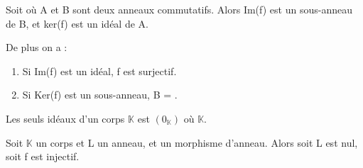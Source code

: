 \documentclass[a4paper, 12pt]{article}
\begin{document}
\begin{proposition}
	Soit  où A et B sont deux anneaux commutatifs. Alors
	Im(f) est un sous-anneau de B, et ker(f) est un idéal de A.

	De plus on a :
	\begin{enumerate}
		\item Si Im(f) est un idéal, f est surjectif.
		\item Si Ker(f) est un sous-anneau, B = .
	\end{enumerate}
\end{proposition}

\begin{proposition}
	Les seuls idéaux d'un corps $\mathbb{K}$ est $(0_{\mathbb{K}})$ où
	$\mathbb{K}$.
\end{proposition}

\begin{corollary}
	Soit $\mathbb{K}$ un corps et L un anneau, et  un
	morphisme d'anneau. Alors soit L est nul, soit f est injectif.
\end{corollary}
\end{document}
